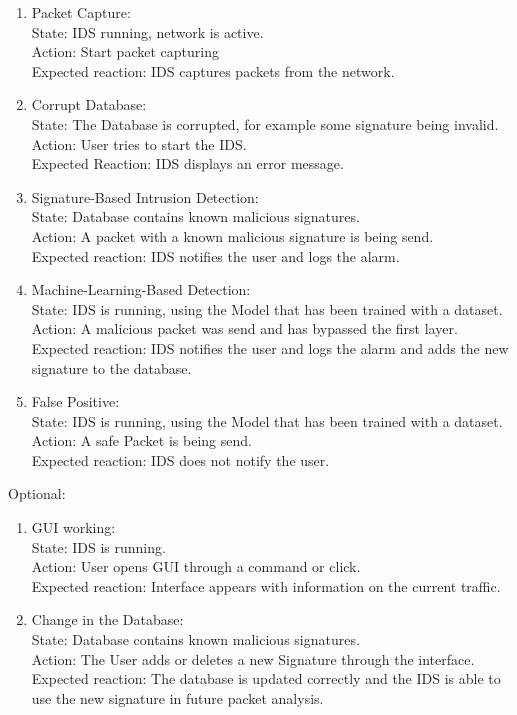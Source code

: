 \documentclass[oneside, english]{reports/assets/sdqtechreport}
\begin{document}
\begin{enumerate}
	\item Packet Capture: \\State: IDS running, network is active. \\Action: Start packet
	      capturing \\Expected reaction: IDS captures packets from the network.
	\item Corrupt Database: \\State: The Database is corrupted, for example some signature
	      being invalid. \\Action: User tries to start the IDS. \\Expected Reaction: IDS
	      displays an error message.
	\item Signature-Based Intrusion Detection: \\State: Database contains known malicious
	      signatures. \\Action: A packet with a known malicious signature is being send.
	      \\Expected reaction: IDS notifies the user and logs the alarm.
	\item Machine-Learning-Based Detection: \\State: IDS is running, using the Model that
	      has been trained with a dataset. \\Action: A malicious packet was send and has
	      bypassed the first layer. \\Expected reaction: IDS notifies the user and logs the
	      alarm and adds the new signature to the database.
	\item False Positive: \\State: IDS is running, using the Model that has been trained
	      with a dataset. \\Action: A safe Packet is being send. \\Expected reaction: IDS
	      does not notify the user.
\end{enumerate}

Optional:

\begin{enumerate}
	\item GUI working: \\State: IDS is running. \\Action: User opens GUI through a command or
	      click. \\Expected reaction: Interface appears with information on the current
	      traffic.
	\item Change in the Database: \\State: Database contains known malicious signatures.
	      \\Action: The User adds or deletes a new Signature through the interface.
	      \\Expected reaction: The database is updated correctly and the IDS is able to use
	      the new signature in future packet analysis.
\end{enumerate}
\end{document}
